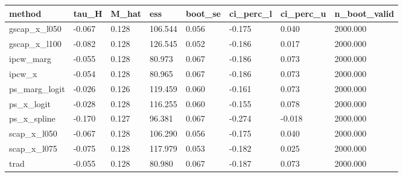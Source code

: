 \begin{tabular}{llllllll}
\hline
method & tau_H & M_hat & ess & boot_se & ci_perc_l & ci_perc_u & n_boot_valid \\
\hline
gscap_x_l050 & -0.067 & 0.128 & 106.544 & 0.056 & -0.175 & 0.040 & 2000.000 \\
gscap_x_l100 & -0.082 & 0.128 & 126.545 & 0.052 & -0.186 & 0.017 & 2000.000 \\
ipcw_marg & -0.055 & 0.128 & 80.973 & 0.067 & -0.186 & 0.073 & 2000.000 \\
ipcw_x & -0.054 & 0.128 & 80.965 & 0.067 & -0.186 & 0.073 & 2000.000 \\
ps_marg_logit & -0.026 & 0.126 & 119.459 & 0.060 & -0.161 & 0.073 & 2000.000 \\
ps_x_logit & -0.028 & 0.128 & 116.255 & 0.060 & -0.155 & 0.078 & 2000.000 \\
ps_x_spline & -0.170 & 0.127 & 96.381 & 0.067 & -0.274 & -0.018 & 2000.000 \\
scap_x_l050 & -0.067 & 0.128 & 106.290 & 0.056 & -0.175 & 0.040 & 2000.000 \\
scap_x_l075 & -0.075 & 0.128 & 117.979 & 0.053 & -0.182 & 0.025 & 2000.000 \\
trad & -0.055 & 0.128 & 80.980 & 0.067 & -0.187 & 0.073 & 2000.000 \\
\hline
\end{tabular}
